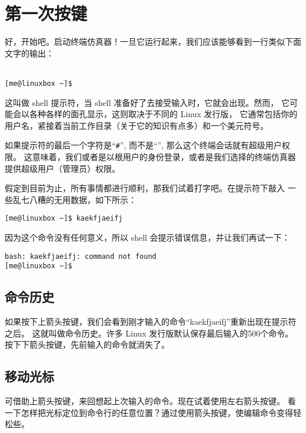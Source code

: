 \section{第一次按键} %
\label{sec:第一次按键}

好，开始吧。启动终端仿真器！一旦它运行起来，我们应该能够看到一行类似下面文字的输出：\\
\\
\begin{lstlisting}
[me@linuxbox ~]$
\end{lstlisting}

\par 这叫做 shell 提示符，当 shell 准备好了去接受输入时，它就会出现。然而， 它可能会以各种各样的面孔显示，这则取决于不同的 Linux 发行版， 它通常包括你的用户名，紧接着当前工作目录（关于它的知识有点多）和一个美元符号。

\par 如果提示符的最后一个字符是``\verb"#"'', 而不是``\textdollar'', 那么这个终端会话就有超级用户权限。 这意味着，我们或者是以根用户的身份登录，或者是我们选择的终端仿真器提供超级用户（管理员）权限。

\par 假定到目前为止，所有事情都进行顺利，那我们试着打字吧。在提示符下敲入 一些乱七八糟的无用数据，如下所示：
\begin{lstlisting}
[me@linuxbox ~]$ kaekfjaeifj
\end{lstlisting}

\par 因为这个命令没有任何意义，所以 shell 会提示错误信息，并让我们再试一下：
\begin{lstlisting}
bash: kaekfjaeifj: command not found
[me@linuxbox ~]$
\end{lstlisting}

\subsection{命令历史}
如果按下上箭头按键，我们会看到刚才输入的命令“kaekfjaeifj”重新出现在提示符之后。 这就叫做命令历史。许多 Linux 发行版默认保存最后输入的500个命令。 按下下箭头按键，先前输入的命令就消失了。

\subsection{移动光标}
可借助上箭头按键，来回想起上次输入的命令。现在试着使用左右箭头按键。 看一下怎样把光标定位到命令行的任意位置？通过使用箭头按键，使编辑命令变得轻松些。

